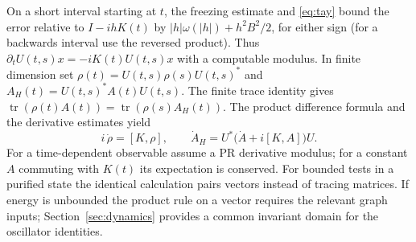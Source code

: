On a short interval starting at $t$, the freezing estimate and \eqref{eq:tay} bound the error relative to $I-ihK(t)$ by $|h|\omega(|h|)+h^2B^2/2$, for either sign (for a backwards interval use the reversed product). Thus $\partial_t U(t,s)x=-iK(t)U(t,s)x$ with a computable modulus. In finite dimension set $\rho(t)=U(t,s)\rho(s)U(t,s)^*$ and $A_H(t)=U(t,s)^*A(t)U(t,s)$. The finite trace identity gives $\operatorname{tr}(\rho(t)A(t))=\operatorname{tr}(\rho(s)A_H(t))$. The product difference formula and the derivative estimates yield
\[
 i\,\dot\rho=[K,\rho],\qquad
 \dot A_H=U^*\bigl(\dot A+i[K,A]\bigr)U .
\]
For a time-dependent observable assume a PR derivative modulus; for a constant $A$ commuting with $K(t)$ its expectation is conserved. For bounded tests in a purified state the identical calculation pairs vectors instead of tracing matrices. If energy is unbounded the product rule on a vector requires the relevant graph inputs; Section~\ref{sec:dynamics} provides a common invariant domain for the oscillator identities.
